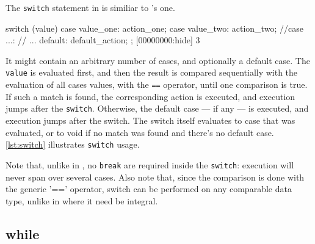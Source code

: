 The \lstinline|switch| statement in \us is similiar to \C's one.

\begin{urbiscript}[frame=, backgroundcolor=, ]
switch (value)
{
  case value_one:
    action_one;
  case value_two:
    action_two;
//case ...:
//  ...
  default:
    default_action;
};
[00000000:hide] 3

\end{urbiscript}

It might contain an arbitrary number of cases, and optionally a
default case. The \lstinline|value| is evaluated first, and then the
result is compared sequentially with the evaluation of all cases
values, with the \lstinline|==| operator, until one comparison is
true. If such a match is found, the corresponding action is executed,
and execution jumps after the \lstinline|switch|. Otherwise, the
default case --- if any --- is executed, and execution jumps after the
switch. The switch itself evaluates to case that was evaluated, or to
void if no match was found and there's no default case. \autoref{lst:switch}
illustrates \lstinline|switch| usage.

Note that, unlike in \C, no \lstinline|break| are required inside the
\lstinline|switch|: execution will never span over several cases. Also
note that, since the comparison is done with the generic '=='
operator, switch can be performed on any comparable data type, unlike
in \C where it need be integral.


\subsection{while}

